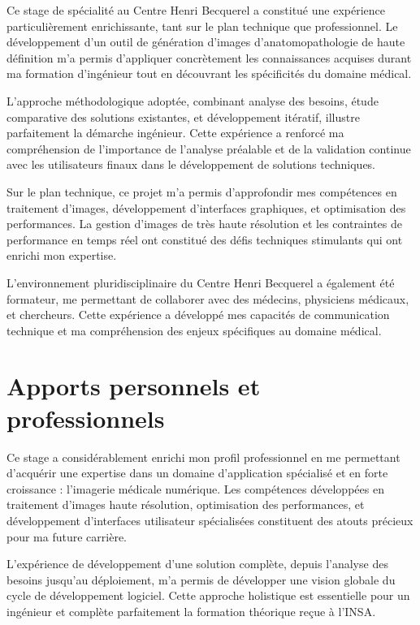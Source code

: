 \documentclass[12pt,a4paper]{report}
\begin{document}
Ce stage de spécialité au Centre Henri Becquerel a constitué une expérience particulièrement enrichissante, tant sur le plan technique que professionnel. Le développement d'un outil de génération d'images d'anatomopathologie de haute définition m'a permis d'appliquer concrètement les connaissances acquises durant ma formation d'ingénieur tout en découvrant les spécificités du domaine médical.

L'approche méthodologique adoptée, combinant analyse des besoins, étude comparative des solutions existantes, et développement itératif, illustre parfaitement la démarche ingénieur. Cette expérience a renforcé ma compréhension de l'importance de l'analyse préalable et de la validation continue avec les utilisateurs finaux dans le développement de solutions techniques.

Sur le plan technique, ce projet m'a permis d'approfondir mes compétences en traitement d'images, développement d'interfaces graphiques, et optimisation des performances. La gestion d'images de très haute résolution et les contraintes de performance en temps réel ont constitué des défis techniques stimulants qui ont enrichi mon expertise.

L'environnement pluridisciplinaire du Centre Henri Becquerel a également été formateur, me permettant de collaborer avec des médecins, physiciens médicaux, et chercheurs. Cette expérience a développé mes capacités de communication technique et ma compréhension des enjeux spécifiques au domaine médical.

\section{Apports personnels et professionnels}

Ce stage a considérablement enrichi mon profil professionnel en me permettant d'acquérir une expertise dans un domaine d'application spécialisé et en forte croissance : l'imagerie médicale numérique. Les compétences développées en traitement d'images haute résolution, optimisation des performances, et développement d'interfaces utilisateur spécialisées constituent des atouts précieux pour ma future carrière.

L'expérience de développement d'une solution complète, depuis l'analyse des besoins jusqu'au déploiement, m'a permis de développer une vision globale du cycle de développement logiciel. Cette approche holistique est essentielle pour un ingénieur et complète parfaitement la formation théorique reçue à l'INSA.
\end{document}
